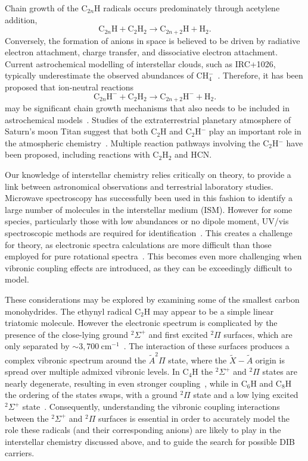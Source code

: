 \documentclass[journal=jpcafh,manuscript=article,layout=onecolumn, 12pt]{achemso}
\begin{document}
Chain growth of the C$_{2n}$H radicals occurs predominately through acetylene addition,
\begin{equation}
\text{C}_{2n}\text{H} + \text{C}_2\text{H}_2 \rightarrow \text{C}_{2n+2}\text{H}+\text{H}_2.
\end{equation}
Conversely, the formation of anions in space is believed to be driven by radiative electron attachment, charge transfer, and dissociative electron attachment. Current astrochemical modelling of interstellar clouds, such as IRC+1026, typically underestimate the observed abundances of CH$_4^-$~\cite{mil17,cor13,her08}. Therefore, it has been proposed that ion-neutral reactions
 \begin{equation}
	\text{C}_{2n}\text{H}^- + \text{C}_2\text{H}_2 \rightarrow \text{C}_{2n+2}\text{H}^- + \text{H}_2.
\end{equation}
may be significant chain growth mechanisms that also needs to be included in astrochemical models~\cite{mil17,bas19}. Studies of the extraterrestrial planetary atmosphere of Saturn's moon Titan suggest that both C$_2$H and C$_2$H$^-$ play an important role in the atmospheric chemistry~\cite{dob16,vui09,des17,vri18}. Multiple reaction pathways involving the C$_2$H$^-$ have been proposed, including reactions with C$_2$H$_2$ and HCN. 

Our knowledge of interstellar chemistry relies critically on theory, to provide a link between astronomical observations and terrestrial laboratory studies. Microwave spectroscopy has successfully been used in this fashion to identify a large number of molecules in the interstellar medium (ISM). However for some species, particularly those with low abundances or no dipole moment, UV/vis spectroscopic methods are required for identification~\cite{mai97}. This creates a challenge for theory, as electronic spectra calculations are more difficult than those employed for pure rotational spectra~\cite{for10}. This becomes even more challenging when vibronic coupling effects are introduced, as they can be exceedingly difficult to model.

These considerations may be explored by examining some of the smallest carbon monohydrides. The ethynyl radical C$_2$H may appear to be a simple linear triatomic molecule. However the electronic spectrum is complicated by the presence of the close-lying ground $^2\Sigma^+$ and first excited $^2\Pi$ surfaces, which are only separated by $\sim3,700~$cm$^{-1}$~\cite{cur85,tar03}. The interaction of these surfaces produces a complex vibronic spectrum around the $\tilde{A}^2\Pi$ state, where the $\tilde{X}-\tilde{A}$ origin is spread over multiple admixed vibronic levels. In C$_4$H the $^2\Sigma^+$ and $^2\Pi$ states are nearly degenerate, resulting in even stronger coupling~\cite{zho07}, while in C$_6$H and C$_8$H the ordering of the states swaps, with a ground $^2\Pi$ state and a low lying excited $^2\Sigma^+$ state~\cite{lin99,tay98}. Consequently, understanding the vibronic coupling interactions between the $^2\Sigma^+$ and $^2\Pi$ surfaces is essential in order to accurately model the role these radicals (and their corresponding anions) are likely to play in the interstellar chemistry discussed above, and to guide the search for possible DIB carriers.
\end{document}
